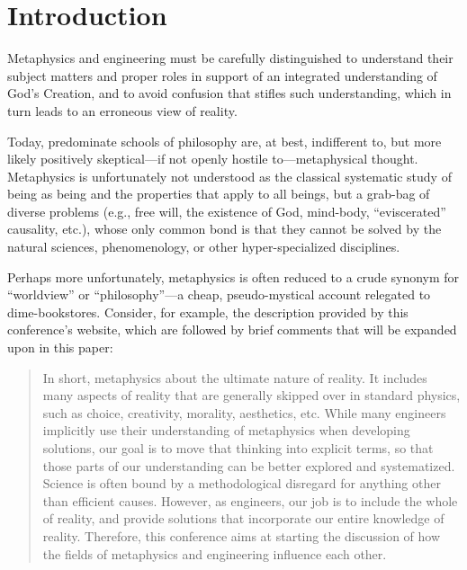 \section{Introduction}



Metaphysics and engineering must be carefully distinguished to understand their subject matters and proper roles in support of an integrated understanding of God's Creation, and to avoid confusion that stifles such understanding, which in turn leads to an erroneous view of reality.

Today, predominate schools of philosophy are, at best, indifferent to, but more likely positively skeptical---if not openly hostile to---metaphysical thought. Metaphysics is unfortunately not understood as the classical systematic study of being as being and the properties that apply to all beings, but a grab-bag of diverse problems (e.g., free will, the existence of God, mind-body, ``eviscerated'' causality, etc.), whose only common bond is that they cannot be solved by the natural sciences, phenomenology, or other hyper-specialized disciplines.

Perhaps more unfortunately, metaphysics is often reduced to a crude synonym for ``worldview'' or ``philosophy''---a cheap, pseudo-mystical account relegated to dime-bookstores. Consider, for example, the description provided by this conference's website, which are followed by brief comments that will be expanded upon in this paper:

\begin{quote}
In short, metaphysics  about the ultimate nature of reality. It includes many aspects of reality that are generally skipped over in standard physics, such as choice, creativity, morality, aesthetics, etc. While many engineers implicitly use their understanding of metaphysics when developing solutions, our goal is to move that thinking into explicit terms, so that those parts of our understanding can be better explored and systematized. Science is often bound by a methodological disregard for anything other than efficient causes. However, as engineers, our job is to include the whole of reality, and provide solutions that incorporate our entire knowledge of reality. Therefore, this conference aims at starting the discussion of how the fields of metaphysics and engineering influence each other.\cite{aboutconference}
\end{quote}

